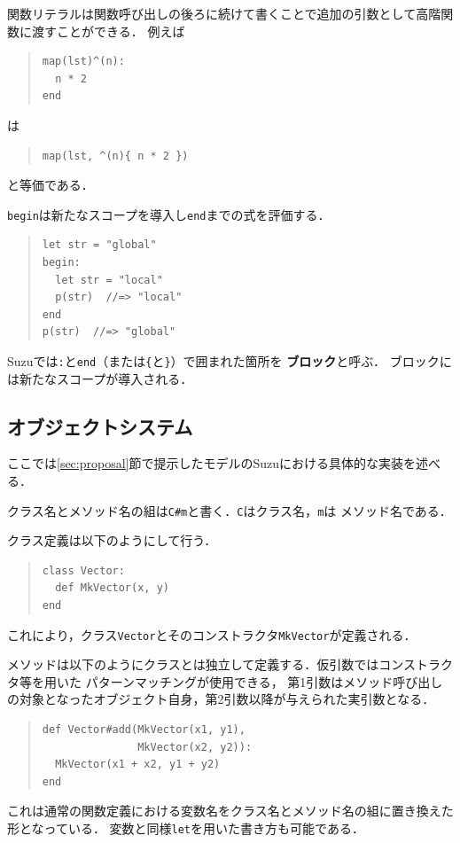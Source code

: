 \documentclass{ipsjprosym}
\begin{document}
関数リテラルは関数呼び出しの後ろに続けて書くことで追加の引数として高階関数に渡すことができる．
例えば
\begin{quote}
\begin{verbatim}
map(lst)^(n):
  n * 2
end
\end{verbatim}
\end{quote}
は
\begin{quote}
\begin{verbatim}
map(lst, ^(n){ n * 2 })
\end{verbatim}
\end{quote}
と等価である．

\verb|begin|は新たなスコープを導入し\verb|end|までの式を評価する．
\begin{quote}
\begin{verbatim}
let str = "global"
begin:
  let str = "local"
  p(str)  //=> "local"
end
p(str)  //=> "global"
\end{verbatim}
\end{quote}
Suzuでは\verb|:|と\verb|end|（または\verb|{|と\verb|}|）で囲まれた箇所を
\textbf{ブロック}と呼ぶ．
ブロックには新たなスコープが導入される．

\subsection{オブジェクトシステム}

ここでは\ref{sec:proposal}節で提示したモデルのSuzuにおける具体的な実装を述べる．

クラス名とメソッド名の組は\verb|C#m|と書く．\verb|C|はクラス名，\verb|m|は
メソッド名である．

クラス定義は以下のようにして行う．
\begin{quote}
\begin{verbatim}
class Vector:
  def MkVector(x, y)
end
\end{verbatim}
\end{quote}
これにより，クラス\verb|Vector|とそのコンストラクタ\verb|MkVector|が定義される．

メソッドは以下のようにクラスとは独立して定義する．仮引数ではコンストラクタ等を用いた
パターンマッチングが使用できる，
第1引数はメソッド呼び出しの対象となったオブジェクト自身，第2引数以降が与えられた実引数となる．
\begin{quote}
\begin{verbatim}
def Vector#add(MkVector(x1, y1),
               MkVector(x2, y2)):
  MkVector(x1 + x2, y1 + y2)
end
\end{verbatim}
\end{quote}
これは通常の関数定義における変数名をクラス名とメソッド名の組に置き換えた形となっている．
変数と同様\verb|let|を用いた書き方も可能である．
\end{document}
